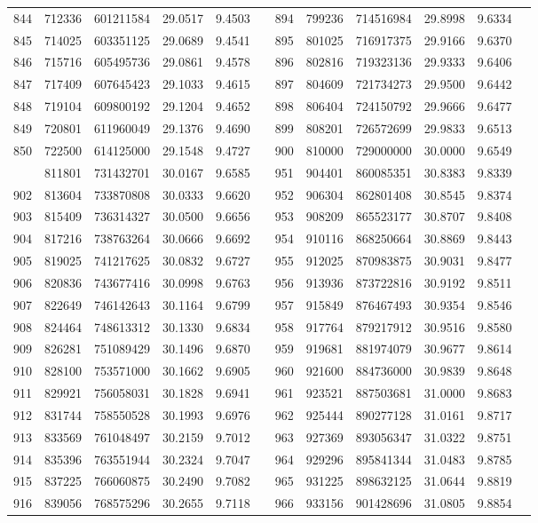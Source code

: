 \begin{longtable}{SSSSSSSSSSSS}
844&712336&601211584&29.0517&9.4503&&894&799236&714516984&29.8998&9.6334\\
845&714025&603351125&29.0689&9.4541&&895&801025&716917375&29.9166&9.6370\\
846&715716&605495736&29.0861&9.4578&&896&802816&719323136&29.9333&9.6406\\
847&717409&607645423&29.1033&9.4615&&897&804609&721734273&29.9500&9.6442\\
848&719104&609800192&29.1204&9.4652&&898&806404&724150792&29.9666&9.6477\\
849&720801&611960049&29.1376&9.4690&&899&808201&726572699&29.9833&9.6513\\
850&722500&614125000&29.1548&9.4727&&900&810000&729000000&30.0000&9.6549\\
&811801&731432701&30.0167&9.6585&&951&904401&860085351&30.8383&9.8339\\
902&813604&733870808&30.0333&9.6620&&952&906304&862801408&30.8545&9.8374\\
903&815409&736314327&30.0500&9.6656&&953&908209&865523177&30.8707&9.8408\\
904&817216&738763264&30.0666&9.6692&&954&910116&868250664&30.8869&9.8443\\
905&819025&741217625&30.0832&9.6727&&955&912025&870983875&30.9031&9.8477\\
906&820836&743677416&30.0998&9.6763&&956&913936&873722816&30.9192&9.8511\\
907&822649&746142643&30.1164&9.6799&&957&915849&876467493&30.9354&9.8546\\
908&824464&748613312&30.1330&9.6834&&958&917764&879217912&30.9516&9.8580\\
909&826281&751089429&30.1496&9.6870&&959&919681&881974079&30.9677&9.8614\\
910&828100&753571000&30.1662&9.6905&&960&921600&884736000&30.9839&9.8648\\
911&829921&756058031&30.1828&9.6941&&961&923521&887503681&31.0000&9.8683\\
912&831744&758550528&30.1993&9.6976&&962&925444&890277128&31.0161&9.8717\\
913&833569&761048497&30.2159&9.7012&&963&927369&893056347&31.0322&9.8751\\
914&835396&763551944&30.2324&9.7047&&964&929296&895841344&31.0483&9.8785\\
915&837225&766060875&30.2490&9.7082&&965&931225&898632125&31.0644&9.8819\\
916&839056&768575296&30.2655&9.7118&&966&933156&901428696&31.0805&9.8854\\

\end{longtable}

